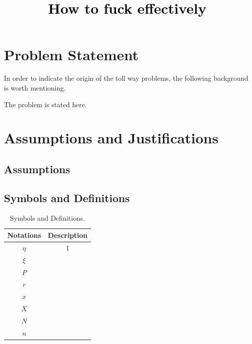 \documentclass[12pt,a4paper]{article}
\newcommand{\PaperTitle}{How to fuck effectively}  %
\begin{document}
\thispagestyle{empty}


\newpage

\title{
\Large{\textcolor{black}{\PaperTitle}}
}




\maketitle



\tableofcontents
\setcounter{tocdepth}{2}

\newpage
\setcounter{page}{1}


\begin{spacing}{1.2} 



\section{Problem Statement}
\label{Problem_Statement}



In order to indicate the origin of the toll way problems, the following background is worth mentioning.

The problem is stated here.


\section{Assumptions and Justifications}
\label{Assumptions_Justifications}

\subsection{Assumptions}


\subsection{Symbols and Definitions}

\begin{table}[H]
\renewcommand{\arraystretch}{1.5}
\caption{Symbols and Definitions.}
\label{Table_Symbols}
\begin{center}
{\footnotesize
\begin{tabular}{c c}
\toprule
{Notations} & {Description} \\
\midrule
{$\eta$}    & {1} \\ 
{$\xi$}     & {} \\ 
$P$   & {} \\ 
$r$     & {} \\
$x$     & {} \\ 
$X$     & {} \\ 
$N$    & {} \\ 
$n$     & {} \\ 
\bottomrule
\end{tabular}}
\end{center}
\end{table}



\end{spacing}
\end{document}
